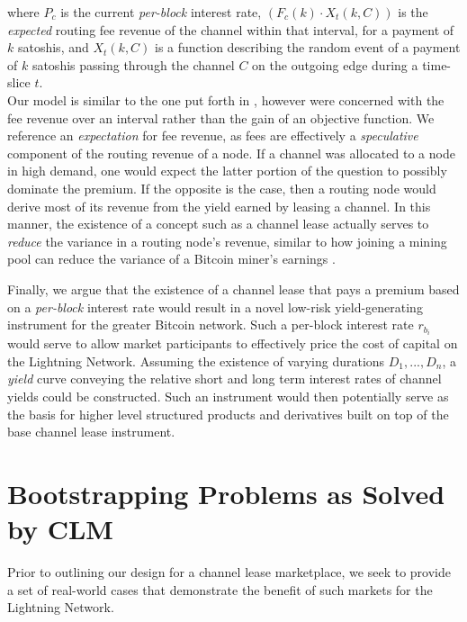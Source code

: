 \documentclass[10pt,a4paper]{article}
\theoremstyle{definition}
\begin{document}
where $P_c$ is the current \emph{per-block} interest rate, $(F_c(k)\cdot
X_{t}(k, C))$ is the \emph{expected} routing fee revenue of the channel within
that interval, for a payment of $k$ satoshis, and $X_{t}(k, C)$ is a function
describing the random event of a payment of $k$ satoshis passing through the
channel $C$ on the outgoing edge during a time-slice $t$. \\

Our model is similar to the one put forth in \cite{payChanProfit}, however were
concerned with the fee revenue over an interval rather than the gain of an
objective function. We reference an \emph{expectation} for fee revenue, as fees
are effectively a \emph{speculative} component of the routing revenue of a
node. If a channel was allocated to a node in high demand, one would expect the
latter portion of the question to possibly dominate the premium. If the
opposite is the case, then a routing node would derive most of its revenue from
the yield earned by leasing a channel. In this manner, the existence of a
concept such as a channel lease actually serves to \emph{reduce} the variance
in a routing node's revenue, similar to how joining a mining pool can reduce
the variance of a Bitcoin miner's earnings \cite{meniVariance}.

Finally, we argue that the existence of a channel lease that pays a premium
based on a \emph{per-block} interest rate would result in a novel low-risk
yield-generating instrument for the greater Bitcoin network. Such a per-block
interest rate $r_{b_i}$ would serve to allow market participants to effectively
price the cost of capital on the Lightning Network. Assuming the existence of
varying durations ${D_1, ..., D_n}$, a \emph{yield} curve conveying the relative
short and long term interest rates of channel yields could be constructed. Such
an instrument would then potentially serve as the basis for higher level
structured products and derivatives built on top of the base channel lease
instrument.


\section{Bootstrapping Problems as Solved by CLM}

Prior to outlining our design for a channel lease marketplace, we seek to
provide a set of real-world cases that demonstrate the benefit of such markets
for the Lightning Network. 
\end{document}
